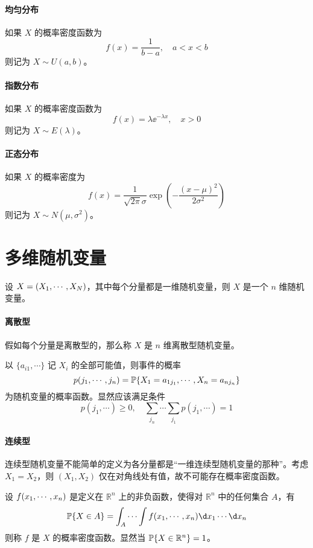 \paragraph{均匀分布}
如果 $X$ 的概率密度函数为
\[ f(x) = \frac{1}{b - a}, \quad a < x < b \]
则记为 $X \sim U(a, b)$。

\paragraph{指数分布}
如果 $X$ 的概率密度函数为
\[ f(x) = \lambda \ee^{-\lambda x}, \quad x > 0 \]
则记为 $X \sim E(\lambda)$。

\paragraph{正态分布}
如果 $X$ 的概率密度为
\[ f(x) = \frac{1}{\sqrt{2 \pi}  \sigma} \exp \left(- \frac{(x - \mu)^2}{2\sigma^2}  \right) \]
则记为 $X \sim N(\mu, \sigma^2)$。

\section{多维随机变量}

设 $X = (X_1,\cdots,X_N)$，其中每个分量都是一维随机变量，则 $X$ 是一个 $n$ 维随机变量。

\paragraph{离散型}

假如每个分量是离散型的，那么称 $X$ 是 $n$ 维离散型随机变量。

\begin{definition}
	以 $\{a_{i1}, \cdots\}$ 记 $X_i$ 的全部可能值，则事件的概率
	\[ p(j_1,\cdots,j_n) = \mathbb{P}\{X_1 = a_{1j_1}, \cdots, X_n = a_{n j_n}\} \]
	为随机变量的概率函数。显然应该满足条件
	\[ p(j_1, \cdots) \geqslant 0, \quad \sum_{j_n} \cdots \sum_{j_1} p(j_1, \cdots)  =1 \]
\end{definition}

\paragraph{连续型}
连续型随机变量不能简单的定义为各分量都是“一维连续型随机变量的那种”。考虑 $X_1 = X_2$，则 $(X_1, X_2)$ 仅在对角线处有值，故不可能存在概率密度函数。

\begin{definition}
	设 $f(x_1,\cdots,x_n)$ 是定义在 $\mathbb{R}^n$ 上的非负函数，使得对 $\mathbb{R}^n$ 中的任何集合 $A$，有
	\[ \bbP\{X \in A\} = \int_A \cdots \int f(\seq{x}{n}) \d x_1 \cdots \d x_n \]
	则称 $f$ 是 $X$ 的概率密度函数。显然当 $\mathbb{P}\{ X \in \mathbb{R}^n\} = 1$。
\end{definition}

